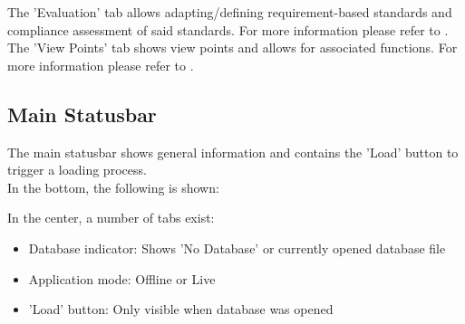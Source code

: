The 'Evaluation' tab allows adapting/defining requirement-based standards  and compliance assessment of said standards. For more information please refer to . \\

The 'View Points' tab shows view points and allows for associated functions. For more information please refer to .

\subsection{Main Statusbar}

The main statusbar shows general information and contains the 'Load' button to trigger a loading process. \\

In the bottom, the following is shown:

In the center, a number of tabs exist:
\begin{itemize}
 \item Database indicator: Shows 'No Database' or currently opened database file
 \item Application mode: Offline or Live
 \item 'Load' button: Only visible when database was opened
\end{itemize}
\  \\






